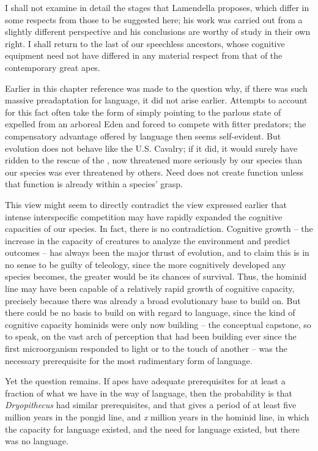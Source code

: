 I shall not examine in detail the stages that Lamendella proposes, which differ in some respects from those to be suggested here; his work was carried out from a slightly different perspective and his conclusions are worthy of study in their own right. I shall return to the last of our speechless ancestors, whose cognitive equipment need not have differed in any material respect from that of the contemporary great apes.

Earlier in this chapter reference was made to the question why, if there was such massive preadaptation for language, it did not arise earlier. Attempts to account for this fact often take the form of simply pointing to the parlous state of  expelled from an arboreal Eden and forced to compete with fitter predators; the compensatory advantage offered by language then seems self-evident. But evolution does not behave like the U.S. Cavalry; if it did, it would surely have ridden to the rescue of the , now threatened more seriously by our species than our species was ever threatened by others. Need does not create function unless that function is already within a species' grasp.

This view might seem to directly contradict the view expressed earlier that intense interspecific competition may have rapidly expanded the cognitive capacities of our species. In fact, there is no contradiction. Cognitive growth -- the increase in the capacity of creatures to analyze the environment and predict outcomes -- has always been the major thrust of evolution, and to claim this is in no sense to be guilty of teleology, since the more cognitively developed any species
becomes, the greater would be its chances of survival. Thus, the hominid line may have been capable of a relatively rapid growth of cognitive capacity, precisely because there was already a broad evolutionary base to build on. But there could be no basis to build on with regard to language, since the kind of cognitive capacity hominids were only now building -- the conceptual capstone, so to speak, on the vast arch of perception that had been building ever since the first microorganism responded to light or to the touch of another -- was the necessary prerequisite for the most rudimentary form of language.

Yet the question remains. If apes have adequate prerequisites for at least a fraction of what we have in the way of language, then the probability is that \textit{Dryopithecus} had similar prerequisites, and that gives a period of at least five million years in the pongid line, and \textit{x} million years in the hominid line, in which the capacity for language existed, and the need for language existed, but there was no language.

